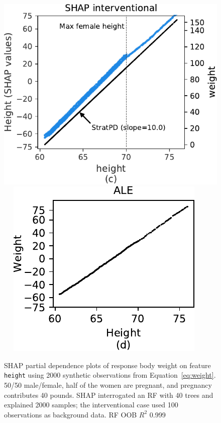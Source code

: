 \documentclass{article}
\renewcommand{\eqref}[1]{Equation~\ref{#1}}
\begin{document}
\begin{figure}[htbp]
\begin{center}
\includegraphics[scale=0.35]{images/weight_interventional_shap.pdf}~~
\includegraphics[scale=0.34]{images/height_ale.pdf}~~
\caption{\small SHAP partial dependence plots of response body weight on feature {\tt height} using 2000 synthetic observations from \eqref{eq:weight}. 50/50 male/female, half of the women are pregnant, and pregnancy contributes 40 pounds. SHAP interrogated an RF with 40 trees and explained 2000 samples; the interventional case used 100 observations as background data. RF OOB $R^2$ 0.999}
\label{fig:heightweight}
\end{center}
\end{figure}
\end{document}
